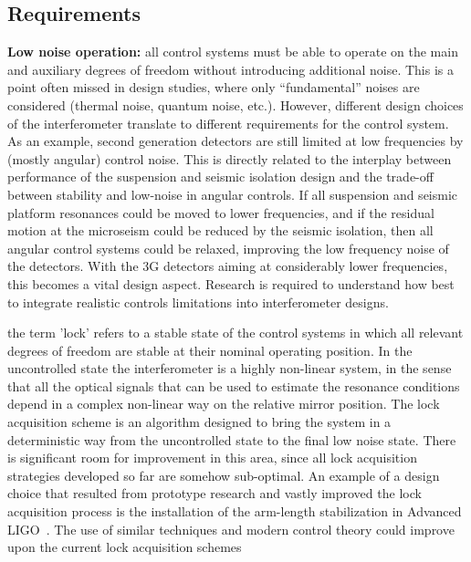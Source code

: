 \subsection{Requirements}
{\bf Low noise operation:} all control systems must be able to operate on the main and auxiliary degrees of freedom without introducing additional noise. This is a point often missed in design studies, where only ``fundamental'' noises are considered (thermal noise, quantum noise, etc.). However, different design choices of the interferometer translate to different requirements for the control system. As an example, second generation detectors are still limited at low frequencies by (mostly angular) control noise. This is directly related to the interplay between performance of the suspension and seismic isolation design and the trade-off between stability and low-noise in angular controls. If all suspension and seismic platform resonances could be moved to lower frequencies, and if the residual motion at the microseism could be reduced by the seismic isolation, then all angular control systems could be relaxed, improving the low frequency noise of the detectors. 
With the 3G detectors aiming at considerably lower frequencies, this becomes a vital design aspect. Research is required to understand how best to integrate realistic controls limitations into interferometer designs.\par
{} the term 'lock' refers to a stable state of the control systems in which all relevant degrees of freedom are stable at their nominal operating position. In the uncontrolled state the interferometer is a highly non-linear system, in the sense that all the optical signals that can be used to estimate the resonance conditions depend in a complex non-linear way on the relative mirror position. The lock acquisition scheme is an algorithm designed to bring the system in a deterministic way from the uncontrolled state to the final low noise state. There is significant room for improvement in this area, since all lock acquisition strategies developed so far are somehow sub-optimal. An example of a design choice that resulted from prototype research and vastly improved the lock acquisition process is the installation of the arm-length stabilization in Advanced LIGO~\cite{Mullavey:12}. The use of similar techniques and modern control theory could improve upon the current lock acquisition schemes

